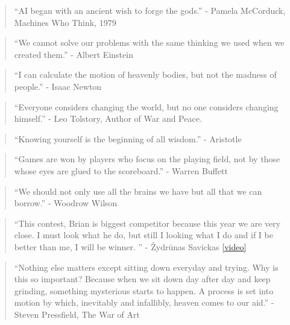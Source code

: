 \begin{quote}
``AI began with an ancient wish to forge the gods.'' - Pamela McCorduck, Machines Who Think, 1979
\end{quote}

\begin{quote}
``We cannot solve our problems with the same thinking we used when we created them.'' - Albert Einstein
\end{quote}

\begin{quote}
	``I can calculate the motion of heavenly bodies, but not the madness of people.'' - Isaac Newton
\end{quote}

\begin{quote}
	``Everyone considers changing the world, but no one considers changing himself.'' - Leo Tolstory, Author of War and Peace.
\end{quote}

\begin{quote}
	``Knowing yourself is the beginning of all wisdom.'' - Aristotle
\end{quote}

\begin{quote}
	``Games are won by players who focus on the playing field, not by those whose eyes are glued to the scoreboard.'' - Warren Buffett
\end{quote} 

\begin{quote}
	``We should not only use all the brains we have but all that we can borrow.'' - Woodrow Wilson
\end{quote}

\begin{quote}
	``This contest, Brian is biggest competitor because this year we are very close. I must look what he do, but still I looking what  I do and if I be better than me, I will be winner. '' - Žydrūnas Savickas \href{https://youtu.be/gAVZU94zLkU?t=3875}{[video]}
\end{quote}

\begin{quote}
	``Nothing else matters except sitting down everyday and trying. Why is this so important? Because when we sit down day after day and keep grinding, something mysterious starts to happen. A process is set into motion by which, inevitably and infallibly, heaven comes to our aid.'' - Steven Pressfield, The War of Art
\end{quote}